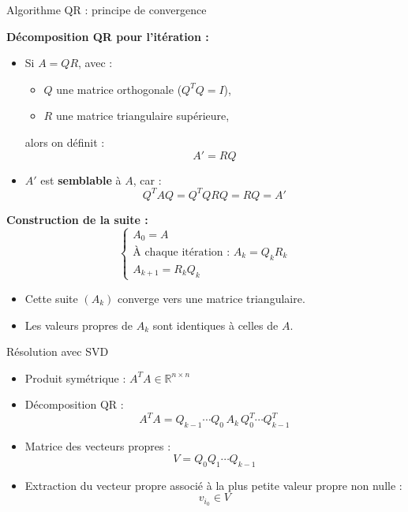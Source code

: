 \begin{frame}{Algorithme QR : principe de convergence}
\scriptsize
\begin{minipage}[t][0.8\textheight][t]{\textwidth}
\vspace*{\fill}
\textbf{Décomposition QR pour l’itération :}
\begin{itemize}
  \item Si \( A = QR \), avec :
  \begin{itemize}
    \scriptsize
    \item \( Q \) une matrice orthogonale (\( Q^T Q = I \)),
    \item \( R \) une matrice triangulaire supérieure,
  \end{itemize}
  \pause
  alors on définit :
  \[
    A' = RQ
  \]
  \pause
  \vspace{-1em}
  \item \( A' \) est \textbf{semblable} à \( A \), car :
  \[
    Q^T A Q = Q^T Q R Q = R Q = A'
  \]
\end{itemize}
\pause
\vspace{-0.3em}
\textbf{Construction de la suite :}
\[
\begin{cases}
A_0 = A \\
\text{À chaque itération : } A_k = Q_k R_k \\
A_{k+1} = R_k Q_k
\end{cases}
\]
\vspace{-0.3em}
\pause
\begin{itemize}
  \item Cette suite \( (A_k) \) converge vers une matrice triangulaire.
  \item Les valeurs propres de \( A_k \) sont identiques à celles de \( A \).
\end{itemize}

\vspace*{\fill}
\end{minipage}

\end{frame}


\begin{frame}{Résolution avec SVD}
\hyperlink{SVD-appendix}{}
\begin{itemize}
  \item Produit symétrique : \( A^T A \in \mathbb{R}^{n \times n} \)
  \pause
  \item Décomposition QR : 
  \[
    A^TA = Q_{k-1} \cdots Q_0 \, A_k \, Q_0^T \cdots Q_{k-1}^T
  \]
  \pause
  \item Matrice des vecteurs propres : 
  \[
    V = Q_0 Q_1 \cdots Q_{k-1}
  \]
  \pause
  \item Extraction du vecteur propre associé à la plus petite valeur propre non nulle :
  \[
    v_{i_0} \in V
  \]
\end{itemize}

\end{frame}
